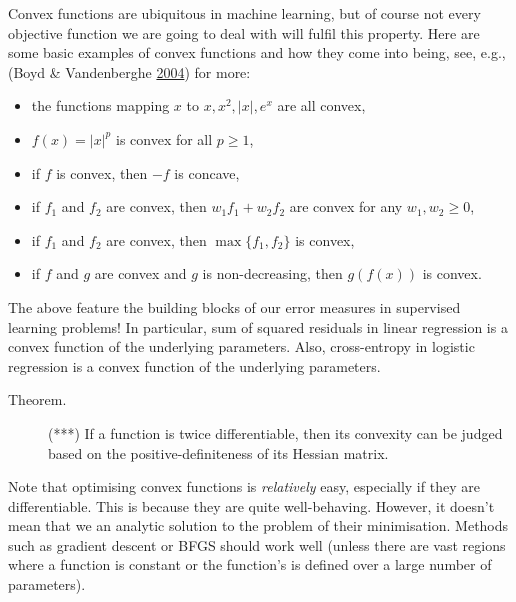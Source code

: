 \documentclass[10pt,b5paper,krantz1]{krantz}
\providecommand{\tightlist}{%
  \setlength{\itemsep}{0pt}\setlength{\parskip}{0pt}}
\begin{document}
Convex functions are ubiquitous in machine learning, but of course not every
objective function we are going to deal with will fulfil this property.
Here are some basic examples of convex functions and how they come into being,
see, e.g., (Boyd \& Vandenberghe \protect\hyperlink{ref-boyd_vandenberghe}{2004}) for more:

\begin{itemize}
\tightlist
\item
  the functions mapping \(x\) to \(x, x^2, |x|, e^x\) are all convex,
\item
  \(f(x)=|x|^p\) is convex for all \(p\ge 1\),
\item
  if \(f\) is convex, then \(-f\) is concave,
\item
  if \(f_1\) and \(f_2\) are convex, then \(w_1 f_1 + w_2 f_2\) are convex for any
  \(w_1,w_2\ge 0\),
\item
  if \(f_1\) and \(f_2\) are convex, then \(\max\{f_1, f_2\}\) is convex,
\item
  if \(f\) and \(g\) are convex and \(g\) is non-decreasing, then \(g(f(x))\) is convex.
\end{itemize}

The above feature the building blocks of our error measures in supervised
learning problems! In particular, sum of squared residuals in linear regression
is a convex function of the underlying parameters. Also,
cross-entropy in logistic regression is a convex function
of the underlying parameters.

\begin{description}
\item[Theorem.]
(***) If a function is twice differentiable,
then its convexity can be judged based on the positive-definiteness
of its Hessian matrix.
\end{description}

Note that optimising convex functions is \emph{relatively} easy,
especially if they are differentiable.
This is because they are quite well-behaving.
However, it doesn't mean that we an analytic solution to the problem
of their minimisation.
Methods such as gradient descent or BFGS should work well
(unless there are vast regions where a function is constant or
the function's is defined over a large number of parameters).
\end{document}
